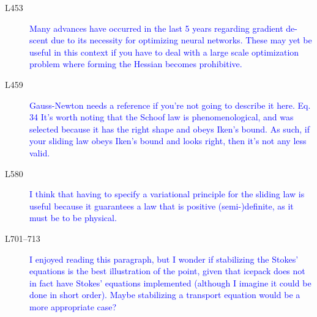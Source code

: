 \documentclass{article}
\theoremstyle{definition}
\theoremstyle{plain}
\begin{document}
\begin{description}
\item[L453] \textcolor{blue}{Many advances have occurred in the last 5 years regarding gradient de-
scent due to its necessity for optimizing neural networks. These may yet
be useful in this context if you have to deal with a large scale optimization
problem where forming the Hessian becomes prohibitive.}
\item[L459] \textcolor{blue}{Gauss-Newton needs a reference if you’re not going to describe it here.
Eq. 34 It’s worth noting that the Schoof law is phenomenological, and was
selected because it has the right shape and obeys Iken’s bound. As such,
if your sliding law obeys Iken’s bound and looks right, then it’s not any
less valid.}
\item[L580] \textcolor{blue}{I think that having to specify a variational principle for the sliding law
is useful because it guarantees a law that is positive (semi-)definite, as it
must be to be physical.}
\item[L701–713] \textcolor{blue}{I enjoyed reading this paragraph, but I wonder if stabilizing the
Stokes’ equations is the best illustration of the point, given that icepack
does not in fact have Stokes’ equations implemented (although I imagine
it could be done in short order). Maybe stabilizing a transport equation
would be a more appropriate case?}
\end{description}
\end{document}
